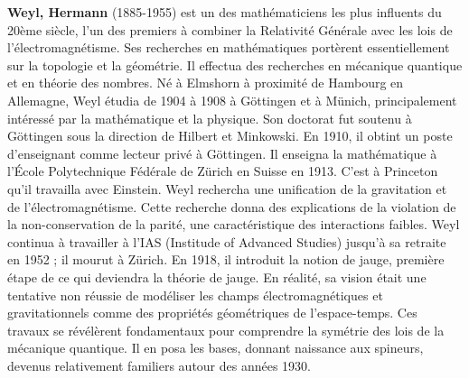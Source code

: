 \textbf{Weyl, Hermann} (1885-1955)  est un des mathématiciens les plus influents du 20ème siècle, l'un des premiers à combiner la Relativité Générale avec les lois de l'électromagnétisme. Ses recherches en mathématiques portèrent essentiellement sur la topologie et la géométrie. Il effectua des recherches en mécanique quantique et en théorie des nombres. Né à Elmshorn à proximité de Hambourg en Allemagne, Weyl étudia de 1904 à 1908 à Göttingen et à Münich, principalement intéressé par la mathématique et la physique. Son doctorat fut soutenu à Göttingen sous la direction de Hilbert et Minkowski. En 1910, il obtint un poste d'enseignant comme lecteur privé à Göttingen. Il enseigna la mathématique à l'École Polytechnique Fédérale de Zürich en Suisse en 1913. C'est à Princeton qu'il travailla avec Einstein. Weyl rechercha une unification de la gravitation et de l'électromagnétisme. Cette recherche donna des explications de la violation de la non-conservation de la parité, une caractéristique des interactions faibles. Weyl continua à travailler à l'IAS (Institude of Advanced Studies) jusqu'à sa retraite en 1952 ; il mourut à Zürich. En 1918, il introduit la notion de jauge, première étape de ce qui deviendra la théorie de jauge. En réalité, sa vision était une tentative non réussie de modéliser les champs électromagnétiques et gravitationnels comme des propriétés géométriques de l'espace-temps. Ces travaux se révélèrent fondamentaux pour comprendre la symétrie des lois de la mécanique quantique. Il en posa les bases, donnant naissance aux spineurs, devenus relativement familiers autour des années 1930.

